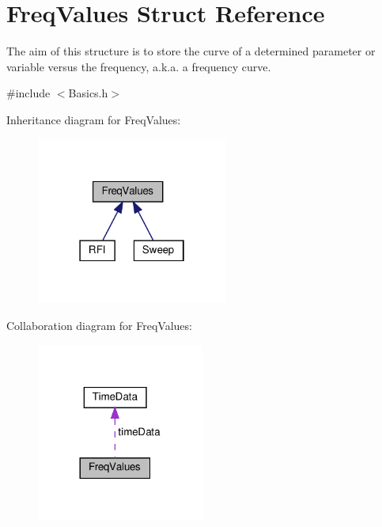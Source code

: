 \hypertarget{structFreqValues}{}\section{Freq\+Values Struct Reference}
\label{structFreqValues}


The aim of this structure is to store the curve of a determined parameter or variable versus the frequency, a.\+k.\+a. a frequency curve.  




{\ttfamily \#include $<$Basics.\+h$>$}



Inheritance diagram for Freq\+Values\+:\nopagebreak
\begin{figure}[H]
\begin{center}
\leavevmode
\includegraphics[width=178pt]{structFreqValues__inherit__graph}
\end{center}
\end{figure}


Collaboration diagram for Freq\+Values\+:\nopagebreak
\begin{figure}[H]
\begin{center}
\leavevmode
\includegraphics[width=156pt]{structFreqValues__coll__graph}
\end{center}
\end{figure}
